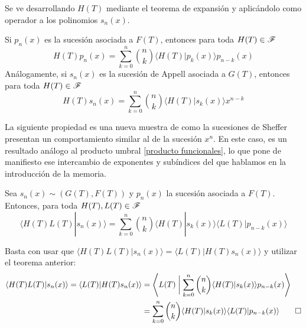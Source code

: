 \begin{demo}
    Se ve desarrollando $H(T)$ mediante el teorema de expansión y aplicándolo como operador a los polinomios $s_n(x)$.
\end{demo}

\begin{corolario}
    Si $p_n(x)$ es la sucesión asociada a $F(T)$, entonces para toda $H(T) \in \mathscr{F}$
    \begin{equation*}
        H(T)p_n(x) = \sum_{k=0}^n \binom{n}{k} \langle H(T) | p_k(x) \rangle p_{n-k}(x)
    \end{equation*}
    Análogamente, si $s_n(x)$ es la sucesión de Appell asociada a $G(T)$, entonces para toda $H(T) \in \mathscr{F}$
    \begin{equation*}
        H(T)s_n(x) = \sum_{k=0}^n \binom{n}{k} \langle H(T) | s_k(x) \rangle x^{n-k}
    \end{equation*}
\end{corolario}

La siguiente propiedad es una nueva muestra de como la sucesiones de Sheffer presentan un comportamiento similar al de la sucesión $x^n$. En este caso, es un resultado análogo al producto umbral \eqref{producto funcionales}, lo que pone de manifiesto ese intercambio de exponentes y subíndices del que hablamos en la introducción de la memoria.

\begin{teorema}
    Sea $s_n(x) \sim (G(T), F(T))$ y $p_n(x)$ la sucesión asociada a $F(T)$. Entonces, para toda $H(T), L(T) \in \mathscr{F}$
    \begin{equation*}
        \langle H(T) L(T) | s_n(x) \rangle = \sum_{k=0}^n \binom{n}{k} \langle H(T) | s_k(x) \rangle \langle L(T) | p_{n-k}(x) \rangle  
    \end{equation*}
\end{teorema}

\begin{demo}
    Basta con usar que $\langle H(T) L(T) | s_n(x) \rangle = \langle L(T) | H(T)s_n(x) \rangle $ y utilizar el teorema anterior:
    \begin{align*}
        \langle H(T) L(T) | s_n(x) \rangle = \langle L(T) | H(T)s_n(x) \rangle & = \left\langle L(T) \biggm| \sum_{k=0}^n \binom{n}{k} \langle H(T) | s_k(x)\rangle p_{n-k}(x) \right\rangle \\
        & = \sum_{k=0}^n \binom{n}{k} \langle H(T) | s_k(x)\rangle \langle L(T) | p_{n-k}(x) \rangle \qedhere
    \end{align*}
\end{demo}


